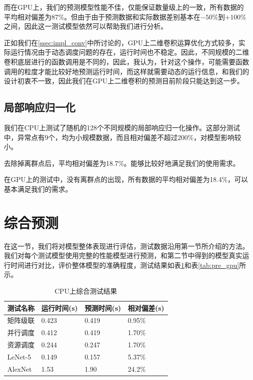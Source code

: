     而在GPU上，我们的预测模型性能不佳，仅能保证数量级上的一致，所有数据的平均相对偏差为87\%。但由于由于预测数据和实际数据差别基本在$ -50\% $到$ +100\% $之间，因此这一测试模型依然可以帮助我们进行分析。
    
    正如我们在\ref{ssec:impl_conv}中所讨论的，GPU上二维卷积运算优化方式较多，实际运行情况由于动态调度问题的存在，运行时间也不稳定。因此，不同规模的二维卷积底层进行的函数调用是不同的，因此，我认为，针对这个操作，可能需要函数调用的粒度才能比较好地预测运行时间，而这样就需要动态的运行信息，和我们的设计初衷不一致，因此我们在GPU上二维卷积的预测目前阶段只能达到这一步。

\subsection{局部响应归一化}
    我们在CPU上测试了随机的128个不同规模的局部响应归一化操作。这部分测试中，异常点有9个，均为小规模数据，而且相对偏差不超过200\%，对模型影响较小。
    
    去除掉离群点后，平均相对偏差为18.7\%。能够比较好地满足我们的使用需求。
    
    在GPU上的测试中，没有离群点的出现，所有数据的平均相对偏差为18.4\%，可以基本满足我们的需求。

\section{综合预测}
    在这一节，我们将对模型整体表现进行评估，测试数据沿用第一节所介绍的方法。我们对每个测试模型使用完整的性能模型进行预测，和第二节中得到的模型真实运行时间进行对比，评价整体模型的准确程度，测试结果如表\ref{tab:pre_cpu}和表\ref{tab:pre_gpu}所示。
    
    \begin{table}[!htbp]
        \centering
	    \caption{CPU上综合测试结果}
        \label{tab:pre_cpu}
        \begin{tabular}{|l|l|l|l|}
            \hline
            测试名称 & 运行时间(s) & 预测时间(s) & 相对偏差(s)\\
            \hline
            矩阵级联 & 0.423 & 0.419 & 0.95\% \\
            \hline
            并行调度 & 0.412 & 0.419 & 1.70\% \\
            \hline
            资源调度 & 0.244 & 0.247 & 1.70\% \\
            \hline
            LeNet-5 & 0.149 & 0.157 & 5.37\% \\
            \hline
            AlexNet & 1.53 & 1.90 & 24.2\% \\
            \hline
        \end{tabular}
    \end{table}
    
